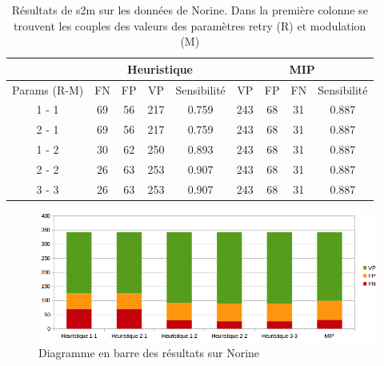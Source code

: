 \begin{table}[!ht]
  \centering
  \begin{tabular}{|c|c|c|c|c|c|c|c|c|}
    \hline
    & \multicolumn{4}{c|}{Heuristique} & \multicolumn{4}{c|}{MIP} \\
    \hline
    Params (R-M) & FN & FP & VP & Sensibilité & VP & FP & FN & Sensibilité \\
    \hline
    1 - 1 & 69 & 56 & 217 & 0.759 & 243 & 68 & 31 & 0.887 \\
    \hline
    2 - 1 & 69 & 56 & 217 & 0.759 & 243 & 68 & 31 & 0.887 \\
    \hline
    1 - 2 & 30 & 62 & 250 & 0.893 & 243 & 68 & 31 & 0.887 \\
    \hline
    2 - 2 & 26 & 63 & 253 & 0.907 & 243 & 68 & 31 & 0.887 \\
    \hline
    3 - 3 & 26 & 63 & 253 & 0.907 & 243 & 68 & 31 & 0.887 \\
    \hline
  \end{tabular}
  \caption{\label{nor_results}Résultats de s2m sur les données de Norine.
  Dans la première colonne se trouvent les couples des valeurs des paramètres retry (R) et modulation (M)}
\end{table}

\begin{figure}[!ht]
  \begin{center}
    \includegraphics[width=450px]{Figures/s2m/results/Norine.png}
    \caption{\label{nor_graph}Diagramme en barre des résultats sur Norine}
  \end{center}
\end{figure}

